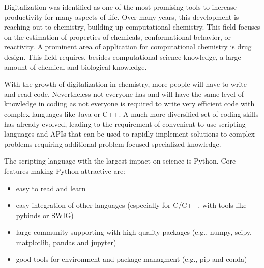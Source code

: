 Digitalization was identified as one of the most promising tools to increase productivity for many aspects of life.\cite{Tuomi2018}
Over many years, this development is reaching out to chemistry, building up computational chemistry. This field focuses on the estimation of properties of chemicals, conformational behavior, or reactivity. A prominent area of application for computational chemistry is drug design. \cite{Cournia2020} This field requires, besides computational science knowledge, a large amount of chemical and biological knowledge. 

With the growth of digitalization in chemistry, more people will have to write and read code. Nevertheless not everyone has and will have the same level of knowledge in coding as not everyone is required to write very efficient code with complex languages like Java or C++. A much more diversified set of coding skills has already evolved, leading to the requirement of convenient-to-use scripting languages and APIs that can be used to rapidly implement solutions to complex problems requiring additional problem-focused specialized knowledge. \cite{ayer2014} 

The scripting language with the largest impact on science is Python. 
Core features making Python attractive are: 
\begin{itemize}
    \item easy to read and learn
    \item easy integration of other languages (especially for C/C++\cite{Stroustrup1995}, with tools like pybinds or SWIG) \cite{Wenzel2011, Beazley1996}
    \item large community supporting with high quality packages (e.g., numpy, scipy, matplotlib, pandas and jupyter) \cite{VanDerWalt2011, Virtanen2020, Hunter2007, Mckinney2010, Kluyver2016}
    \item good tools for environment and package managment (e.g., pip and conda) \cite{pypi2021,anaconda2020}
\end{itemize}
\cite{Oliphant2007}

